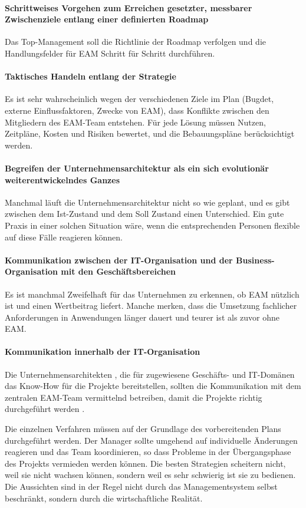 \documentclass[
	doc,
	a4paper,
	helv
	]{apa6}
\begin{document}
\paragraph{Schrittweises Vorgehen zum Erreichen gesetzter, messbarer Zwischenziele entlang einer definierten Roadmap}
Das Top-Management soll die Richtlinie der Roadmap verfolgen und die Handlungsfelder für EAM Schritt für Schritt durchführen.
\paragraph{Taktisches Handeln entlang der Strategie}
Es ist sehr wahrscheinlich wegen der verschiedenen Ziele im Plan (Bugdet, externe Einflussfaktoren, Zwecke von EAM), dass Konflikte zwischen den Mitgliedern des EAM-Team entstehen. Für jede Lösung müssen Nutzen, Zeitpläne, Kosten und Risiken bewertet, und die Bebauungspläne berücksichtigt werden.
\paragraph{Begreifen der Unternehmensarchitektur als ein sich evolutionär weiterentwickelndes  Ganzes}
Manchmal läuft die Unternehmensarchitektur nicht so wie geplant, und es gibt zwischen dem Ist-Zustand und dem Soll Zustand einen Unterschied. Ein gute Praxis in einer solchen Situation wäre, wenn die entsprechenden Personen flexible auf diese Fälle reagieren können.
\paragraph{Kommunikation zwischen der IT-Organisation und der Business-Organisation mit den Geschäftsbereichen}
Es ist manchmal Zweifelhaft für das Unternehmen zu erkennen, ob EAM nützlich ist und einen Wertbeitrag liefert. Manche merken, dass die Umsetzung fachlicher Anforderungen in Anwendungen länger dauert und teurer ist als zuvor ohne EAM.
\paragraph{Kommunikation innerhalb der IT-Organisation}
Die Unternehmensarchitekten , die für zugewiesene Geschäfts- und IT-Domänen das Know-How für die Projekte bereitstellen, sollten die Kommunikation mit dem zentralen EAM-Team vermittelnd betreiben, damit die Projekte richtig durchgeführt werden \autocite{Korotkov2013}.

Die einzelnen Verfahren müssen auf der Grundlage des vorbereitenden Plans durchgeführt werden. Der Manager sollte umgehend auf individuelle Änderungen reagieren und das Team koordinieren, so dass Probleme in der Übergangsphase des Projekts vermieden werden können. Die besten Strategien scheitern nicht, weil sie nicht wachsen können, sondern weil es sehr schwierig ist sie zu bedienen. Die Aussichten sind in der Regel nicht durch das Managementsystem selbst beschränkt, sondern durch die wirtschaftliche Realität. %
\end{document}
